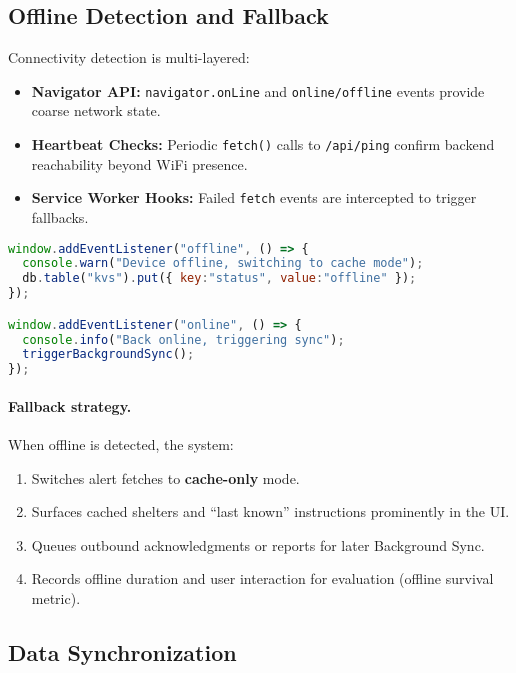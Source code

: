 \documentclass[11pt,twocolumn]{article}
\begin{document}
\subsection{Offline Detection and Fallback}

Connectivity detection is multi-layered:

\begin{itemize}
    \item \textbf{Navigator API:} \texttt{navigator.onLine} and \texttt{online/offline} events provide coarse network state.
    \item \textbf{Heartbeat Checks:} Periodic \texttt{fetch()} calls to \texttt{/api/ping} confirm backend reachability beyond WiFi presence.
    \item \textbf{Service Worker Hooks:} Failed \texttt{fetch} events are intercepted to trigger fallbacks.
\end{itemize}

\begin{lstlisting}[language=JavaScript, caption={Offline Detection System}]
window.addEventListener("offline", () => {
  console.warn("Device offline, switching to cache mode");
  db.table("kvs").put({ key:"status", value:"offline" });
});

window.addEventListener("online", () => {
  console.info("Back online, triggering sync");
  triggerBackgroundSync();
});
\end{lstlisting}

\paragraph{Fallback strategy.}
When offline is detected, the system:
\begin{enumerate}
    \item Switches alert fetches to \textbf{cache-only} mode.
    \item Surfaces cached shelters and ``last known'' instructions prominently in the UI.
    \item Queues outbound acknowledgments or reports for later Background Sync.
    \item Records offline duration and user interaction for evaluation (offline survival metric).
\end{enumerate}

\subsection{Data Synchronization}
\end{document}
